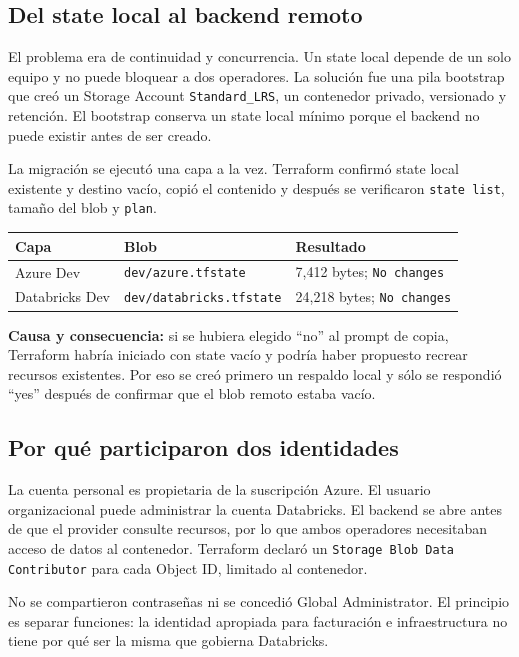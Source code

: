 \documentclass[11pt,a4paper]{article}
\begin{document}
\subsection{Del state local al backend remoto}

El problema era de continuidad y concurrencia. Un state local depende de un solo equipo y no puede
bloquear a dos operadores. La solución fue una pila bootstrap que creó un Storage Account
\texttt{Standard\_LRS}, un contenedor privado, versionado y retención. El bootstrap conserva un state
local mínimo porque el backend no puede existir antes de ser creado.

La migración se ejecutó una capa a la vez. Terraform confirmó state local existente y destino vacío,
copió el contenido y después se verificaron \texttt{state list}, tamaño del blob y \texttt{plan}.

\begin{center}
\begin{tabularx}{\textwidth}{p{}p{}X}
\toprule
\textbf{Capa} & \textbf{Blob} & \textbf{Resultado} \\
\midrule
Azure Dev & \texttt{dev/azure.tfstate} & 7,412 bytes; \texttt{No changes} \\
Databricks Dev & \texttt{dev/databricks.tfstate} & 24,218 bytes; \texttt{No changes} \\
\bottomrule
\end{tabularx}
\end{center}

\textbf{Causa y consecuencia:} si se hubiera elegido ``no'' al prompt de copia, Terraform habría
iniciado con state vacío y podría haber propuesto recrear recursos existentes. Por eso se creó primero
un respaldo local y sólo se respondió ``yes'' después de confirmar que el blob remoto estaba vacío.

\subsection{Por qué participaron dos identidades}

La cuenta personal es propietaria de la suscripción Azure. El usuario organizacional puede administrar
la cuenta Databricks. El backend se abre antes de que el provider consulte recursos, por lo que ambos
operadores necesitaban acceso de datos al contenedor. Terraform declaró un
\texttt{Storage Blob Data Contributor} para cada Object ID, limitado al contenedor.

No se compartieron contraseñas ni se concedió Global Administrator. El principio es separar funciones:
la identidad apropiada para facturación e infraestructura no tiene por qué ser la misma que gobierna
Databricks.
\end{document}
